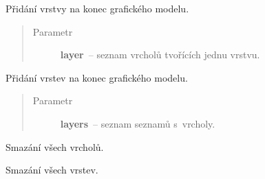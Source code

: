 \begin{fulllineitems}
\begin{fulllineitems}
\end{fulllineitems}


\begin{fulllineitems}
\label{alex.infer:alex.infer.factor.alex.infer.lbp.LBP.add_layer}
Přidání vrstvy na konec grafického modelu.
\begin{quote}\begin{description}
\item[{Parametr}] \leavevmode
\textbf{layer}~-- seznam vrcholů tvořících jednu vrstvu.

\end{description}\end{quote}

\end{fulllineitems}


\begin{fulllineitems}
\label{alex.infer:alex.infer.factor.alex.infer.lbp.LBP.add_layers}
Přidání vrstev na konec grafického modelu.
\begin{quote}\begin{description}
\item[{Parametr}] \leavevmode
\textbf{layers}~-- seznam seznamů s~vrcholy.

\end{description}\end{quote}

\end{fulllineitems}


\begin{fulllineitems}
\label{alex.infer:alex.infer.factor.alex.infer.lbp.LBP.clear_nodes}
Smazání všech vrcholů.

\end{fulllineitems}


\begin{fulllineitems}
\label{alex.infer:alex.infer.factor.alex.infer.lbp.LBP.clear_layers}
Smazání všech vrstev.


\end{fulllineitems}
\end{fulllineitems}

